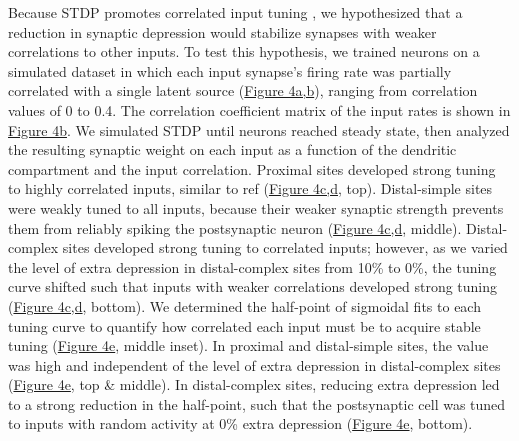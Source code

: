 Because STDP promotes correlated input tuning \citep{songCompetitiveHebbianLearning2000}, we hypothesized that a reduction in synaptic depression would stabilize synapses with weaker correlations to other inputs. To test this hypothesis, we trained neurons on a simulated dataset in which each input synapse's firing rate was partially correlated with a single latent source (\hyperref[fig:4]{Figure 4a,b}), ranging from correlation values of 0 to 0.4. The correlation coefficient matrix of the input rates is shown in \hyperref[fig:4]{Figure 4b}. We simulated STDP until neurons reached steady state, then analyzed the resulting synaptic weight on each input as a function of the dendritic compartment and the input correlation. Proximal sites developed strong tuning to highly correlated inputs, similar to ref \citep{songCompetitiveHebbianLearning2000} (\hyperref[fig:4]{Figure 4c,d}, top). Distal-simple sites were weakly tuned to all inputs, because their weaker synaptic strength prevents them from reliably spiking the postsynaptic neuron (\hyperref[fig:4]{Figure 4c,d}, middle). Distal-complex sites developed strong tuning to correlated inputs; however, as we varied the level of extra depression in distal-complex sites from 10\% to 0\%, the tuning curve shifted such that inputs with weaker correlations developed strong tuning (\hyperref[fig:4]{Figure 4c,d}, bottom). We determined the half-point of sigmoidal fits to each tuning curve to quantify how correlated each input must be to acquire stable tuning (\hyperref[fig:4]{Figure 4e}, middle inset). In proximal and distal-simple sites, the value was high and independent of the level of extra depression in distal-complex sites (\hyperref[fig:4]{Figure 4e}, top \& middle). In distal-complex sites, reducing extra depression led to a strong reduction in the half-point, such that the postsynaptic cell was tuned to inputs with random activity at 0\% extra depression (\hyperref[fig:4]{Figure 4e}, bottom). 

